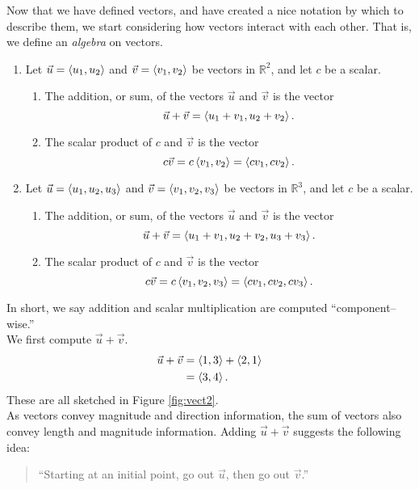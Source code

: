 Now that we have defined vectors, and have created a nice notation by which to describe them, we start considering how vectors interact with each other. That is, we define an \textit{algebra} on vectors. 
\clearpage

{\begin{enumerate}
	\item Let $\vec u = \left\langle u_1,u_2\right\rangle$ and $\vec v = \left\langle v_1,v_2\right\rangle$ be vectors in $\mathbb{R}^2$, and let $c$ be a scalar. 
				\begin{enumerate}
					\item The addition, or sum, of the vectors $\vec u$ and $\vec v$ is the vector
					$$\vec u+\vec v = \left\langle u_1+v_1, u_2+v_2\right\rangle.$$
					\item	The scalar product of $c$ and $\vec v$ is the vector 
					$$c\vec v = c\left\langle v_1,v_2\right\rangle = \left\langle cv_1,cv_2\right\rangle.$$
				\end{enumerate}
	\item Let $\vec u = \left\langle u_1,u_2,u_3\right\rangle$ and $\vec v = \left\langle v_1,v_2,v_3\right\rangle$ be vectors in $\mathbb{R}^3$, and let $c$ be a scalar. 
				\begin{enumerate}
					\item The addition, or sum, of the vectors $\vec u$ and $\vec v$ is the vector
					$$\vec u+\vec v = \left\langle u_1+v_1, u_2+v_2, u_3+v_3\right\rangle.$$
					\item	The scalar product of $c$ and $\vec v$ is the vector 
					$$c\vec v = c\left\langle v_1,v_2,v_3\right\rangle = \left\langle cv_1,cv_2,cv_3\right\rangle.$$
				\end{enumerate}
\end{enumerate}
}

In short, we say addition and scalar multiplication are computed ``component--wise.''\\

	{We first compute $\vec u +\vec v$. 
	\begin{align*}
	\vec u+\vec v &= \left\langle 1,3\right\rangle + \left\langle 2,1\right\rangle\\
								&= \left\langle 3,4\right\rangle.
	\end{align*}
	These are all sketched in Figure \ref{fig:vect2}.
}\\
	
As vectors convey magnitude and direction information, the sum of vectors also convey length and magnitude information. Adding $\vec u+\vec v$ suggests the following idea:
\begin{quotation}
``Starting at an initial point, go out $\vec u$, then go out $\vec v$.''
\end{quotation}

